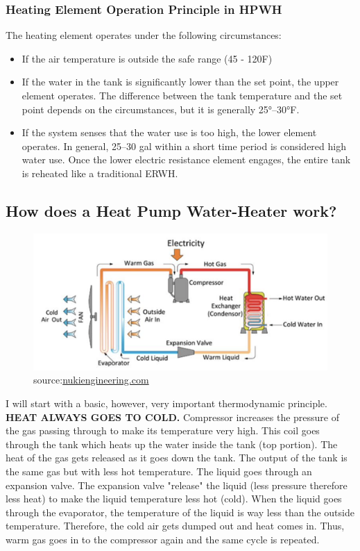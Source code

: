 \subsubsection{Heating Element Operation Principle in HPWH}
The heating element operates under the following circumstances:
\begin{itemize}
    \item If the air temperature is outside the safe range (45 - 120F)
    \item If the water in the tank is significantly lower than the set point, the upper element operates. The difference between the tank temperature and the set point depends on the circumstances, but it is generally 25°–30°F.
    \item If the system senses that the water use is too high, the lower element operates. In general, 25–30 gal within a short time period is considered high water use. Once the lower electric resistance element engages, the entire tank is reheated like a traditional ERWH.
\end{itemize}
\newpage
\subsection{How does a Heat Pump Water-Heater work?}
    \begin{figure}[htp!]
        \centering
        \includegraphics[width=1.1\columnwidth]{Pictures/HPWH_working_principle.png}
        \caption{source:\href{https://inukiengineering.com/heat-pump-water-heaters/}{nukiengineering.com}}
        \label{fig:EWH}
    \end{figure}
I will start with a basic, however, very important thermodynamic principle. \textbf{HEAT ALWAYS GOES TO COLD.} Compressor increases the pressure of the gas passing through to make its temperature very high. This coil goes through the tank which heats up the water inside the tank (top portion). The heat of the gas gets released as it goes down the tank. The output of the tank is the same gas but with less hot temperature. The liquid goes through an expansion valve. The expansion valve "release" the liquid (less pressure therefore less heat) to make the liquid temperature less hot (cold). When the liquid goes through the evaporator, the temperature of the liquid is way less than the outside temperature. Therefore, the cold air gets dumped out and heat comes in. Thus, warm gas goes in to the compressor again and the same cycle is repeated.
